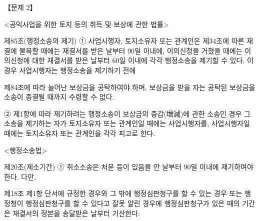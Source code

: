 \begin{longquestion}{【문제 2】}
\begin{framedtext}
<공익사업을 위한 토지 등의 취득 및 보상에 관한 법률> \par
제85조(행정소송의 제기) ① 사업시행자, 토지소유자 또는 관계인은 제34조에 따른 재결에 불복할 때에는 재결서를 받은 날부터 90일 이내에, 이의신청을 거쳤을 때에는 이의신청에 대한 재결서를 받은 날부터 60일 이내에 각각 행정소송을 제기할 수 있다. 이 경우 사업시행자는 행정소송을 제기하기 전에 \par
제84조에 따라 늘어난 보상금을 공탁하여야 하며, 보상금을 받을 자는 공탁된 보상금을 소송이 종결될 때까지 수령할 수 없다. \par
② 제1항에 따라 제기하려는 행정소송이 보상금의 증감(增減)에 관한 소송인 경우 그 소송을 제기하는 자가 토지소유자 또는 관계인일 때에는 사업시행자를, 사업시행자일 때에는 토지소유자 또는 관계인을 각각 피고로 한다. \par
<행정소송법> \par
제20조(제소기간) ① 취소소송은 처분 등이 있음을 안 날부터 90일 이내에 제기하여야 한다. 다만, \par
제18조 제1항 단서에 규정한 경우와 그 밖에 행정심판청구를 할 수 있는 경우 또는 행정청이 행정심판청구를 할 수 있다고 잘못 알린 경우에 행정심판청구가 있은 때의 기간은 재결서의 정본을 송달받은 날부터 기산한다. \par
\end{framedtext}
\end{longquestion}
